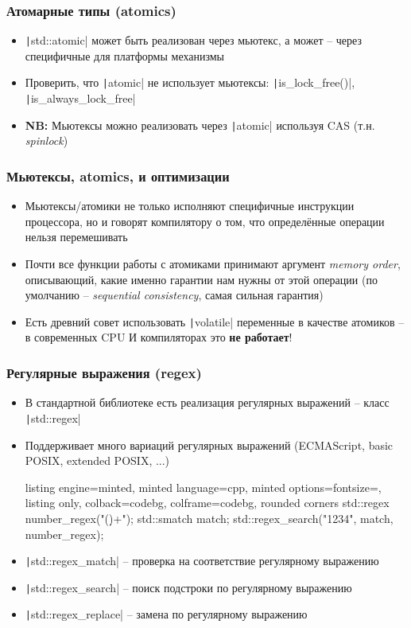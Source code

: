 \documentclass[10pt]{beamer}
\begin{document}
\begin{frame}[fragile]
\frametitle{Атомарные типы (atomics)}
\begin{itemize}
\item \texttt|std::atomic| может быть реализован через мьютекс, а может -- через специфичные для платформы механизмы
\pause
\item Проверить, что \texttt|atomic| не использует мьютексы: \texttt|is_lock_free()|, \texttt|is_always_lock_free|
\pause
\item \textbf{NB:} Мьютексы можно реализовать через \texttt|atomic| используя CAS (т.н. \textit{spinlock})
\end{itemize}
\end{frame}

\begin{frame}[fragile]
\frametitle{Мьютексы, atomics, и оптимизации}
\begin{itemize}
\item Мьютексы/атомики не только исполняют специфичные инструкции процессора, но и говорят компилятору о том, что определённые операции нельзя перемешивать
\pause
\item Почти все функции работы с атомиками принимают аргумент \textit{memory order}, описывающий, какие именно гарантии нам нужны от этой операции (по умолчанию -- \textit{sequential consistency}, самая сильная гарантия)
\pause
\item Есть древний совет использовать \texttt|volatile| переменные в качестве атомиков -- в современных CPU И компиляторах это \textbf{не работает}!
\end{itemize}
\end{frame}

\begin{frame}[fragile]
\frametitle{Регулярные выражения (regex)}
\begin{itemize}
\item В стандартной библиотеке есть реализация регулярных выражений -- класс \texttt|std::regex|
\pause
\item Поддерживает много вариаций регулярных выражений (ECMAScript, basic POSIX, extended POSIX, ...)
\pause
{}
\begin{tcblisting}{listing engine=minted, minted language=cpp, minted options={fontsize=\scriptsize}, listing only, colback=codebg, colframe=codebg, rounded corners}
std::regex number_regex("(\d)+");
std::smatch match;
std::regex_search("1234", match, number_regex);
\end{tcblisting}
\pause
{}
\item \texttt|std::regex_match| -- проверка на соответствие регулярному выражению
\pause
\item \texttt|std::regex_search| -- поиск подстроки по регулярному выражению
\pause
\item \texttt|std::regex_replace| -- замена по регулярному выражению
\end{itemize}
\end{frame}
\end{document}
